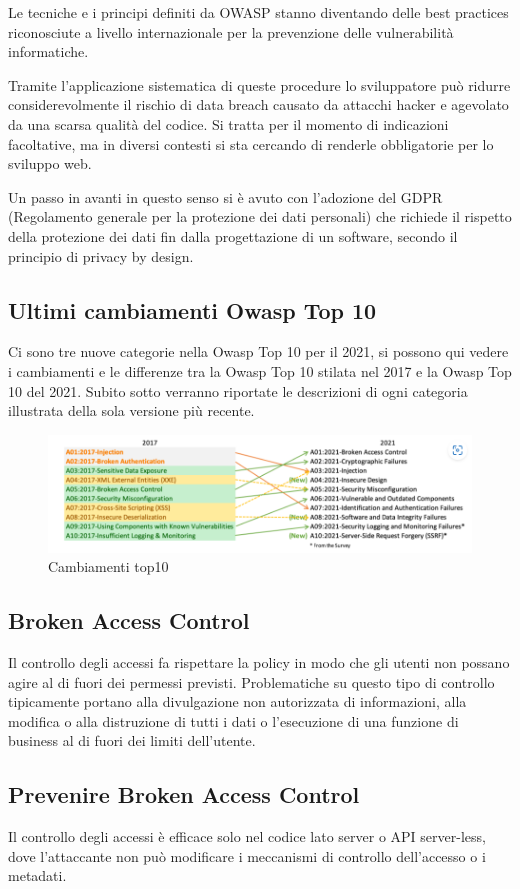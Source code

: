 Le tecniche e i principi definiti da OWASP stanno diventando delle best practices riconosciute a livello internazionale per la prevenzione delle vulnerabilità informatiche.

Tramite l’applicazione sistematica di queste procedure lo sviluppatore può ridurre considerevolmente il rischio di data breach causato da attacchi hacker e agevolato da una scarsa qualità del codice.
Si tratta per il momento di indicazioni facoltative, ma in diversi contesti si sta cercando di renderle obbligatorie per lo sviluppo web.

Un passo in avanti in questo senso si è avuto con l’adozione del GDPR (Regolamento generale per la protezione dei dati personali) che richiede il rispetto della protezione dei dati fin dalla progettazione di un software, secondo il principio di privacy by design.
\subsection{Ultimi cambiamenti Owasp Top 10} 
Ci sono tre nuove categorie nella Owasp Top 10 per il 2021, si possono qui vedere i cambiamenti e le differenze tra la Owasp Top 10 stilata nel 2017 e la Owasp Top 10 del 2021.
Subito sotto verranno riportate le descrizioni di ogni categoria illustrata della sola versione più recente.
\begin{figure}[H]
    \centering
    \includegraphics[scale=0.8]{Immagini/img3.png}
    \caption{Cambiamenti top10}
    \label{fig:cambiamentiTop10}
\end{figure}
\cite{Top10}
\subsection{Broken Access Control} 
Il controllo degli accessi fa rispettare la policy in modo che gli utenti non possano agire al di fuori dei permessi previsti. Problematiche su questo tipo di controllo tipicamente portano alla divulgazione non autorizzata di informazioni, alla modifica o alla distruzione di tutti i dati o l'esecuzione di una funzione di business al di fuori dei limiti dell'utente. 
\subsection{Prevenire Broken Access Control}
Il controllo degli accessi è efficace solo nel codice lato server o API server-less, dove l'attaccante non può modificare i meccanismi di controllo dell'accesso o i metadati.

